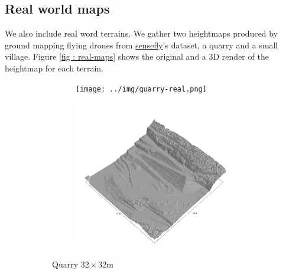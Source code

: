 \documentclass[../document.tex]{subfiles}
\begin{document}
\subsection{Real world maps}
We also include real word terrains. We gather two heightmaps produced by ground mapping flying drones from \href{https://www.sensefly.com/education/datasets/}{sensefly}'s dataset, a quarry and a small village. Figure \ref{fig : real-maps} shows the original and a 3D render of the heightmap for each terrain.
\begin{figure}[htbp]
    \centering
    \begin{subfigure}[b]{1\textwidth}
    \begin{subfigure}[b]{0.45\textwidth}
        \texttt{[image: ../img/quarry-real.png]}
    \end{subfigure}
    \begin{subfigure}[b]{0.45\textwidth}
        \includegraphics[width=\textwidth]{../img/hm3d_borders/querry-big-10.png}
    \end{subfigure}
    \caption{Quarry $32 \times 32$m}
    \label{fig : real-maps-quarry}
\end{subfigure}
\begin{subfigure}[b]{1\textwidth}
    \begin{subfigure}[b]{0.45\textwidth}

\end{subfigure}
\end{subfigure}
\end{figure}
\end{document}
